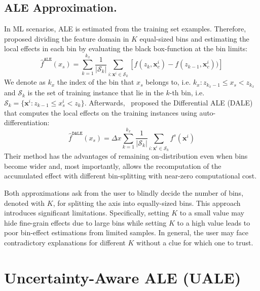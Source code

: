 \documentclass[twoside]{article}
\newcommand{\xc}{\mathbf{x}_c}
\newcommand{\xb}{\mathbf{x}}
\begin{document}
\subsection{ALE Approximation.}
\label{sec:ale-approximation}

In ML scenarios, ALE is estimated from the training set
examples. Therefore, \citep{apley2020visualizing} proposed dividing
the feature domain in \(K\) equal-sized bins and estimating the local effects in
each bin by evaluating the black box-function at the bin limits:
\begin{equation}
  \label{eq:ALE_accumulated_mean_est}
  \hat{f}^{\mathtt{ALE}}(x_s) = \sum_{k=1}^{k_x} \frac{1}{|\mathcal{S}_k|} \sum_{i:\mathbf{x}^i \in
    \mathcal{S}_k} \left [ f(z_{k}, \xc^i) - f(z_{k-1}, \xc^i)) \right ]
\end{equation}
We denote as \(k_x\) the index of the bin that \(x_s\) belongs to,
i.e. \(k_x: z_{k_x-1} \leq x_s < z_{k_x} \) and \(\mathcal{S}_k\) is
the set of training instance that lie in the \(k\)-th bin, i.e.
\( \mathcal{S}_k = \{ \xb^i : z_{k-1} \leq x^i_s < z_{k} \}
\). Afterwards,~\citep{gkolemis22} proposed the Differential ALE
(DALE) that computes the local effects on the training instances using
auto-differentiation:
\begin{equation}
  \label{eq:DALE_accumulated_mean_est}
  \hat{f}^{\mathtt{DALE}}(x_s) = \Delta x \sum_{k=1}^{k_x} \frac{1}{|\mathcal{S}_k|} \sum_{i:\mathbf{x}^i \in
    \mathcal{S}_k} f^s(\mathbf{x}^i)
\end{equation}
%
Their method has the advantages of remaining on-distribution even when
bins become wider and, most importantly, allows the recomputation of
the accumulated effect with different bin-splitting with near-zero
computational cost.

Both approximations ask from the user to blindly decide the number of
bins, denoted with \(K\), for splitting the axis into equally-sized
bins. This approach introduces significant limitations. Specifically, setting \(K\) to a small
value may hide fine-grain effects due to large bins while setting \(K\)
to a high value leads to poor bin-effect estimations from limited
samples. In general, the user may face contradictory explanations for
different \(K\) without a clue for which one to trust.

\section{Uncertainty-Aware ALE (UALE)}
\label{sec:UALE}
\end{document}
